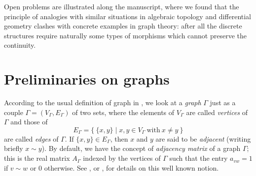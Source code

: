\documentclass{amsart}
\theoremstyle{definition}
\numberwithin{equation}{section}
\begin{document}
Open problems are illustrated along the manuscript, where we found that the principle of analogies with similar situations in algebraic topology and differential geometry clashes with concrete examples in graph theory: after all the discrete structures require naturally some types of morphisms which  cannot preserve the continuity.







\section{Preliminaries on graphs}\label{section2}
According to the usual definition of graph in \cite{spectrabook, crs}, we look at a \textit{graph} $\Gamma$ just as a couple  $\Gamma = (V_\Gamma, E_\Gamma)$ of two sets, where the elements of $V_\Gamma$ are called \textit{vertices} of  $\Gamma$  and those of   \begin{equation} E_\Gamma=\{ \ \{x,y\}  \mid x,y \in V_\Gamma \ \mbox{with}  \ x \neq y \ \}\end{equation}   are called   \textit{edges} of $\Gamma$. If   $\{x,y\} \in E_\Gamma$, then $x$ and $y$ are said to be \textit{adjacent}  (writing briefly $x \sim y$).  By default, we have the concept of  \textit{adjacency matrix} of a graph $\Gamma$; this is the real matrix $A_\Gamma$ indexed by the vertices of $\Gamma$ such that the entry $a_{vw} = 1$ if $v \sim w$ or $0$ otherwise. See \cite[Chapter 1]{crs}, or \cite[Chapter 1]{spectrabook}, for details on this well known notion.
\end{document}
